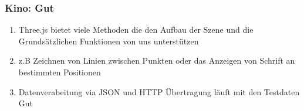 \documentclass[a4paper, 11pt]{article}
\begin{document}
\subsubsection{Kino: Gut}
\begin{enumerate}
    \item Three.js bietet viele Methoden die den Aufbau der Szene und die Grundsätzlichen Funktionen von uns unterstützen
    \item z.B Zeichnen von Linien zwischen Punkten oder das Anzeigen von Schrift an bestimmten Positionen
    \item Datenverabeitung via JSON und HTTP Übertragung läuft mit den Testdaten Gut

\end{enumerate}

\clearpage
\end{document}
